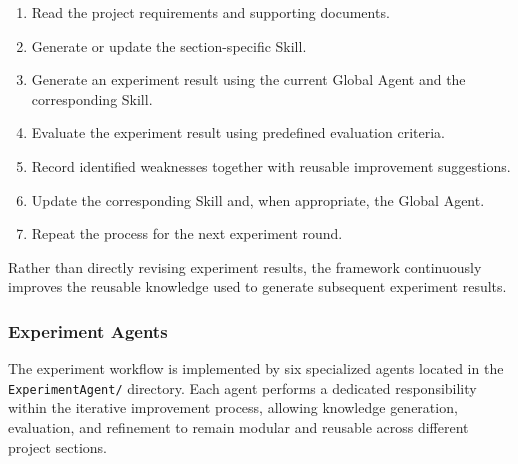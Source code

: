 \begin{enumerate}

    \item Read the project requirements and supporting documents.

    \item Generate or update the section-specific Skill.

    \item Generate an experiment result using the current Global Agent and the corresponding Skill.

    \item Evaluate the experiment result using predefined evaluation criteria.

    \item Record identified weaknesses together with reusable improvement suggestions.

    \item Update the corresponding Skill and, when appropriate, the Global Agent.

    \item Repeat the process for the next experiment round.

\end{enumerate}

Rather than directly revising experiment results, the framework continuously improves the reusable knowledge used to generate subsequent experiment results.

\subsubsection{Experiment Agents}

The experiment workflow is implemented by six specialized agents located in the \texttt{ExperimentAgent/} directory. Each agent performs a dedicated responsibility within the iterative improvement process, allowing knowledge generation, evaluation, and refinement to remain modular and reusable across different project sections.

